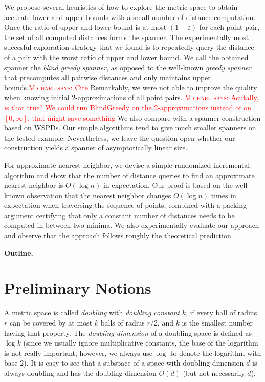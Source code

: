 \documentclass[a4paper,USenglish]{socg-lipics-v2018}
\newcommand{\eps}{\varepsilon}
\newcommand{\myparagraph}[1]{\textbf{#1.}}
\def\marrow{\marginpar[\hfill$\longrightarrow$]{$\longleftarrow$}}
\def\michael#1{\textcolor{red}{\textsc{Michael says: }{\marrow\sf #1}}}
\begin{document}
We propose several heuristics of how to explore the metric space to obtain accurate lower and upper bounds
with a small number of distance computation. Once the ratio of upper and lower bound is at most $(1+\eps)$
for each point pair, the set of all computed distances forms the spanner.
The experimentally most succesful exploration strategy that we found is to
repeatedly query the distance of a pair with the worst ratio of upper and lower bound.
We call the obtained spanner the \emph{blind greedy spanner}, as opposed to the well-known
\emph{greedy spanner} that precomputes all pairwise distances and only maintains upper bounds.\michael{Cite}
Remarkably, we were not able to improve the quality when knowing initial $2$-approximations of all point pairs.
\michael{Acutally, is that true? We could run BlindGreedy on the 2-approximations instead of on $[0,\infty]$,
that might save something}
We also compare with a spanner construction based on WSPDs. Our simple algorithms tend to give much smaller
spanners on the tested example. Nevertheless, we leave the question open whether our construction
yields a spanner of asymptotically linear size.

For approximate nearest neighbor, we devise a simple randomized incremental algorithm and show that
the number of distance queries to find an approximate nearest neighbor is $O(\log n)$ in expectation.
Our proof is based on the well-known observation that the nearest neighbor changes $O(\log n)$ times
in expectation when traversing the sequence of points, combined with a packing argument certifying that
only a constant number of distances needs to be computed in-between two minima.
We also experimentally evaluate our approach and observe that the approach follows 
roughly the theoretical prediction.

\myparagraph{Outline}


\section{Preliminary Notions}
%
A metric space is called \textit{doubling} with \textit{doubling constant} $k$,
if every ball of radius $r$ can be covered by at most $k$ balls of radius $r/2$,
and $k$ is the smallest number having that property.
The \textit{doubling dimension} of a doubling space is defined as $\log k$
(since we usually ignore multiplicative constants, the base of the logarithm is not really important; however,
we always use $\log$ to denote the logarithm with base 2).
It is easy to see that a subspace of a space with doubling dimension $d$ 
is always doubling and has the doubling dimension $O(d)$ (but not necessarily $d$).
\end{document}
